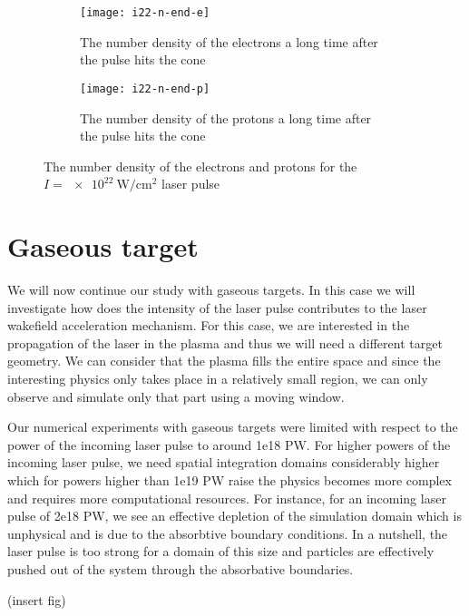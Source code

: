 \documentclass[12pt, class=report, crop=false]{standalone}
\begin{document}
\begin{figure}[h]
  \centering
  \begin{subfigure}[b]{0.475\textwidth}
    \centering
    \texttt{[image: i22-n-end-e]}
    \caption{The number density of the electrons a long time after the pulse
    hits the cone}%
  \end{subfigure}
  \hfill
  \begin{subfigure}[b]{0.475\textwidth}
    \centering
    \texttt{[image: i22-n-end-p]}
    \caption{The number density of the protons a long time after the pulse
    hits the cone}%
  \end{subfigure}
  \caption{The number density of the electrons and protons for the
  \(I=\SI{e22}{\watt\per\centi\metre\squared}\) laser pulse}%
  \label{fig:cone-22-number-density}%
\end{figure}

\section{Gaseous target}

We will now continue our study with gaseous targets. In this case
we will investigate how does the intensity of the laser pulse
contributes to the laser wakefield acceleration mechanism.
For this case, we are interested in the propagation of the laser
in the plasma and thus we will need a different target geometry.
We can consider that the plasma fills the entire space and since
the interesting physics only takes place in a relatively small
region, we can only observe and simulate only that part using a moving window.

Our numerical experiments with gaseous targets were limited with
respect to the power of the incoming laser pulse to around
1e18 PW. For higher powers of the incoming laser pulse, we need
spatial integration domains considerably higher which for powers
higher than 1e19 PW raise the physics becomes more complex and
requires more computational resources. For instance, for an
incoming laser pulse of 2e18 PW, we see an effective depletion
of the simulation domain which is unphysical and is due to the
absorbtive boundary conditions. In a nutshell, the laser pulse is
too strong for a domain of this size and particles are effectively
pushed out of the system through the absorbative boundaries.

(insert fig)
\end{document}
